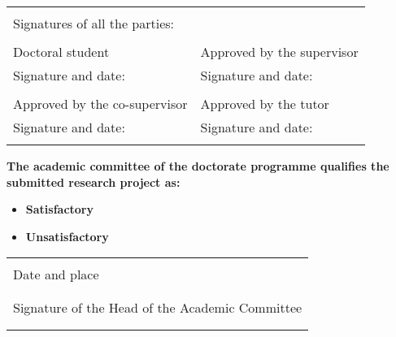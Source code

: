 \begin{tabularx}{\textwidth}{l l}
    \Xhline{0.5pt} \\
    Signatures of all the parties: & \\
    \vspace{0.5cm} \\
    Doctoral student & Approved by the supervisor \\
    Signature and date: & Signature and date: \\
    \vspace{1.35cm} \\
    Approved by the co-supervisor & Approved by the tutor \\
    Signature and date: & Signature and date: \\
    \vspace{1.35cm}
\end{tabularx}

\vspace{0.5cm}

\textbf{The academic committee of the doctorate programme qualifies the submitted research project as:}

\begin{itemize}
    \renewcommand{\labelitemi}{$\bullet$}
    \item \large{\textbf{Satisfactory}}
    \item \large{\textbf{Unsatisfactory}}
\end{itemize}

\vspace{2cm}

\begin{tabularx}{\textwidth}{l}
\Xhline{0.5pt} \\
Date and place \\
\vspace{0.5cm} \\
\Xhline{0.5pt} \\
Signature of the Head of the Academic Committee \\
\vspace{1cm} \\
\Xhline{0.5pt} \\
\end{tabularx}

\endinput